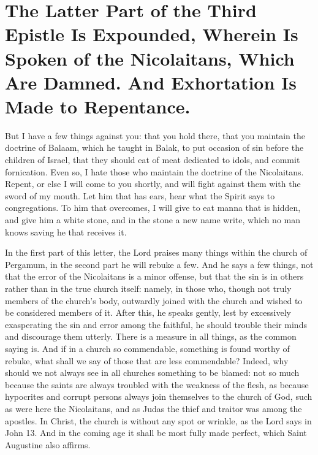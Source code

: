 \chapter[Sermon 11. The Latter Part of the Third Epistle Is Expounded, Wherein Is Spoken of the Nicolaitans, Which Are Damned. And Exhortation Is Made to Repentance.]{The Latter Part of the Third Epistle Is Expounded, Wherein Is Spoken of the Nicolaitans, Which Are Damned. And Exhortation Is Made to Repentance.}
\label{sermon:011}

But I have a few things against you: that you hold there, that you maintain the doctrine of Balaam, which he taught in Balak, to put occasion of sin before the children of Israel, that they should eat of meat dedicated to idols, and commit fornication. Even so, I hate those who maintain the doctrine of the Nicolaitans. Repent, or else I will come to you shortly, and will fight against them with the sword of my mouth. Let him that has ears, hear what the Spirit says to congregations. To him that overcomes, I will give to eat manna that is hidden, and give him a white stone, and in the stone a new name write, which no man knows saving he that receives it.

In the first part of this letter, the Lord praises many things within the church of Pergamum, in the second part he will rebuke a few. And he says a few things, not that the error of the Nicolaitans is a minor offense, but that the sin is in others rather than in the true church itself: namely, in those who, though not truly members of the church’s body, outwardly joined with the church and wished to be considered members of it. After this, he speaks gently, lest by excessively exasperating the sin and error among the faithful, he should trouble their minds and discourage them utterly. There is a measure in all things, as the common saying is. And if in a church so commendable, something is found worthy of rebuke, what shall we say of those that are less commendable? Indeed, why should we not always see in all churches something to be blamed: not so much because the saints are always troubled with the weakness of the flesh, as because hypocrites and corrupt persons always join themselves to the church of God, such as were here the Nicolaitans, and as Judas the thief and traitor was among the apostles. In Christ, the church is without any spot or wrinkle, as the Lord says in John 13. And in the coming age it shall be most fully made perfect, which Saint Augustine also affirms.

